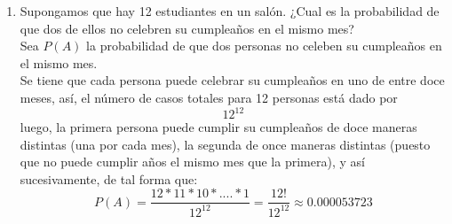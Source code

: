 \documentclass[12pt,a4paper]{report}
\begin{document}
\begin{enumerate}
  \item{
	Supongamos que hay 12 estudiantes en un salón. ¿Cual es la probabilidad de
	que dos de ellos no celebren su cumpleaños en el mismo mes?\\

	Sea $P(A)$ la probabilidad de que dos personas no celeben su cumpleaños en el
	mismo mes.\\

	Se tiene que cada persona puede celebrar su cumpleaños en uno de entre doce
	meses, así, el número de casos totales para 12 personas está dado por
		$$12^{12}$$
	luego, la primera persona puede cumplir su cumpleaños de doce maneras distintas
	(una por cada mes), la segunda de once maneras distintas (puesto que no puede
	cumplir años el mismo mes que la primera), y así sucesivamente, de tal forma
	que:
		$$P(A) = \frac{12 * 11 * 10 * .... * 1}{12^{12}} = \frac{12!}{12^{12}}
				\approx 0.000053723$$
  }





\end{enumerate}
\end{document}
